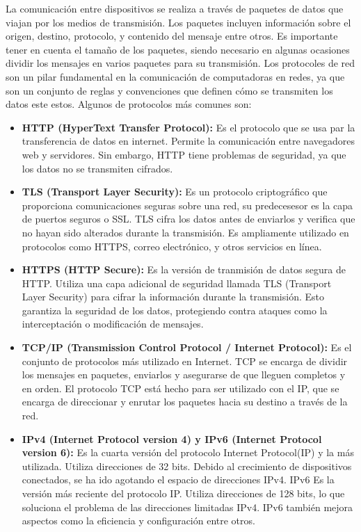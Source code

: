 La comunicación entre dispositivos se realiza a través de paquetes de datos que viajan por los medios de transmisión. Los paquetes incluyen información sobre el origen, destino, protocolo, y contenido del mensaje entre otros. Es importante tener en cuenta el tamaño de los paquetes, siendo necesario en algunas ocasiones dividir los mensajes en varios paquetes para su transmisión.
Los protocoles de red son un pilar fundamental en la comunicación de computadoras en redes, ya que son un conjunto de reglas y convenciones que definen cómo se transmiten los datos este estos.
Algunos de protocolos más comunes son:
\begin{itemize}
	\item \textbf{HTTP (HyperText Transfer Protocol):} Es el protocolo que se usa par la transferencia de datos en internet. Permite la comunicación entre navegadores web y servidores. Sin embargo, HTTP tiene problemas de seguridad, ya que los datos no se transmiten cifrados.
	\item \textbf{TLS (Transport Layer Security):} Es un protocolo criptográfico que proporciona comunicaciones seguras sobre una red, su predecesesor es la capa de puertos seguros o SSL. TLS cifra los datos antes de enviarlos y verifica que no hayan sido alterados durante la transmisión. Es ampliamente utilizado en protocolos como HTTPS, correo electrónico, y otros servicios en línea. ~\cite{SushilJajodia2025}

	\item \textbf{HTTPS (HTTP Secure):} Es la versión de tranmisión de datos segura de HTTP. Utiliza una capa adicional de seguridad llamada TLS (Transport Layer Security) para cifrar la información durante la transmisión. Esto garantiza la seguridad de los datos, protegiendo contra ataques como la interceptación o modificación de mensajes. ~\cite{SushilJajodia2025}

	\item \textbf{TCP/IP (Transmission Control Protocol / Internet Protocol):} Es el conjunto de protocolos más utilizado en Internet. TCP se encarga de dividir los mensajes en paquetes, enviarlos y asegurarse de que lleguen completos y en orden. El protocolo TCP está hecho para ser utilizado con el IP, que se encarga de direccionar y enrutar los paquetes hacia su destino a través de la red.~\cite{Protocolo}

	\item \textbf{IPv4 (Internet Protocol version 4) y IPv6 (Internet Protocol version 6):} Es la cuarta versión del protocolo Internet Protocol(IP) y la más utilizada. Utiliza direcciones de 32 bits. Debido al crecimiento de dispositivos conectados, se ha ido agotando el espacio de direcciones IPv4.
	IPv6 Es la versión más reciente del protocolo IP. Utiliza direcciones de 128 bits, lo que soluciona el problema de las direcciones limitadas IPv4. IPv6 también mejora aspectos como la eficiencia y configuración entre otros.


\end{itemize}
